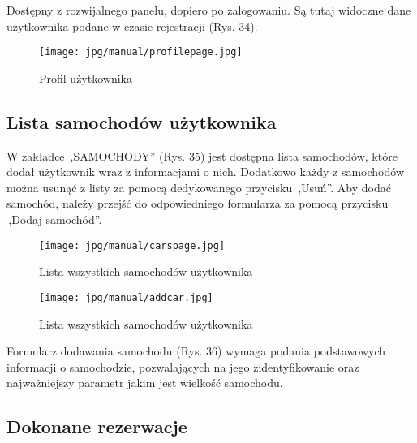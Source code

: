 \documentclass[11pt,a4paper]{article}
\begin{document}
\noindent
Dostępny z rozwijalnego panelu, dopiero po zalogowaniu. Są tutaj widoczne dane użytkownika podane w czasie rejestracji (Rys. 34).

\begin{figure}[H]
    \centering
    \texttt{[image: jpg/manual/profilepage.jpg]}
    \caption{Profil użytkownika}
\end{figure}

\subsection{Lista samochodów użytkownika}

\noindent
W zakładce \,,SAMOCHODY'' (Rys. 35) jest dostępna lista samochodów, które dodał użytkownik wraz z informacjami o nich. Dodatkowo każdy z samochodów można usunąć z listy za pomocą dedykowanego przycisku \,,Usuń''. Aby dodać samochód, należy przejść do odpowiedniego formularza za pomocą przycisku \,,Dodaj samochód''.

\begin{figure}[H]
    \centering
    \texttt{[image: jpg/manual/carspage.jpg]}
    \caption{Lista wszystkich samochodów użytkownika}
\end{figure}

\begin{figure}[H]
    \centering
    \texttt{[image: jpg/manual/addcar.jpg]}
    \caption{Lista wszystkich samochodów użytkownika}
\end{figure}

\noindent
Formularz dodawania samochodu (Rys. 36) wymaga podania podstawowych informacji o samochodzie, pozwalających na jego zidentyfikowanie oraz najważniejszy parametr jakim jest wielkość samochodu.

\subsection{Dokonane rezerwacje}
\end{document}
